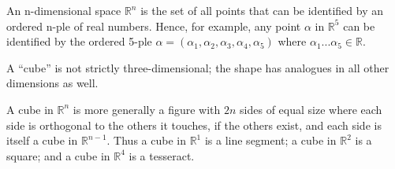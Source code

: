 \begin{mydef}
An n-dimensional space $ \mathbb{R}^{n} $ is the set of all points that can be identified by an ordered n-ple of real numbers. Hence, for example, any point $ \alpha $ in $ \mathbb{R}^{5} $ can be identified by the ordered 5-ple $ \alpha = (\alpha_{1}, \alpha_{2}, \alpha_{3}, \alpha_{4}, \alpha_{5})$ where $ \alpha_{1} ... \alpha_{5} \in \mathbb{R} $.\end{mydef}

A ``cube'' is not strictly three-dimensional; the shape has analogues in all other dimensions as well. 
\begin{mydef}A cube in $\mathbb{R}^n$ is more generally a figure with $2n$ sides of equal size where each side is orthogonal to the others it touches, if the others exist, and each side is itself a cube in $\mathbb{R}^{n-1}$. Thus a cube in $\mathbb{R}^1$ is a line segment; a cube in $\mathbb{R}^2$ is a square; and a cube in $\mathbb{R}^4$ is a tesseract.\end{mydef}


